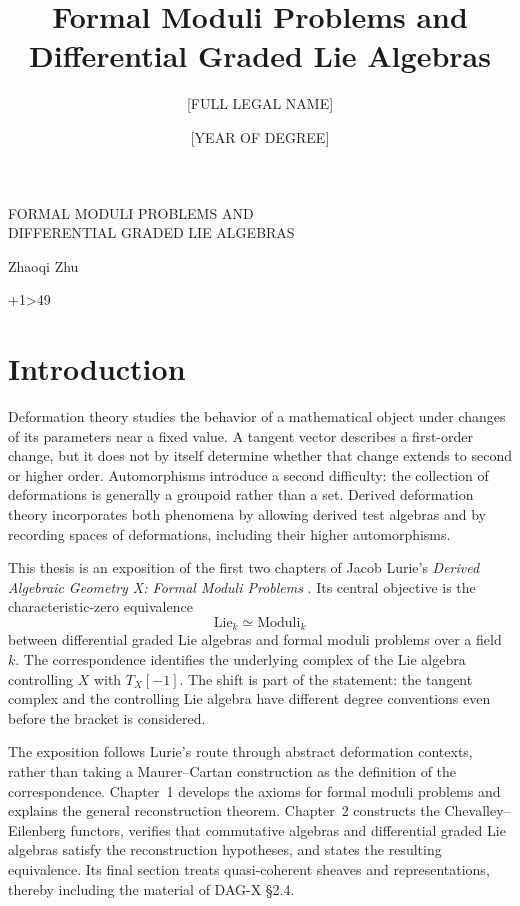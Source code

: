 \documentclass[12pt,letterpaper,oneside]{report}
\title{Formal Moduli Problems and Differential Graded Lie Algebras}
\author{[FULL LEGAL NAME]}
\date{[YEAR OF DEGREE]}
\newcommand{\ThesisTitle}{FORMAL MODULI PROBLEMS AND\\DIFFERENTIAL GRADED LIE ALGEBRAS}
\newcommand{\AuthorName}{Zhaoqi Zhu}
\theoremstyle{definition}
\theoremstyle{remark}
\newcommand{\Lie}{\mathrm{Lie}}
\newcommand{\FMP}{\mathrm{Moduli}}
\begin{document}
\thispagestyle{empty}
\begin{center}
\vspace*{1.5in}
{\Large\ThesisTitle\par}
\vspace{0.4in}
\AuthorName\par
\end{center}
\clearpage
\ifnum\numexpr{}+1\relax>49
  \tableofcontents
  \clearpage
\fi
{}
\chapter*{Introduction}
\label{ch:introduction}

Deformation theory studies the behavior of a mathematical object under changes of its parameters near a fixed value. A tangent vector describes a first-order change, but it does not by itself determine whether that change extends to second or higher order. Automorphisms introduce a second difficulty: the collection of deformations is generally a groupoid rather than a set. Derived deformation theory incorporates both phenomena by allowing derived test algebras and by recording spaces of deformations, including their higher automorphisms.

This thesis is an exposition of the first two chapters of Jacob Lurie's \emph{Derived Algebraic Geometry X: Formal Moduli Problems} \cite{DAGX}. Its central objective is the characteristic-zero equivalence
\[
  \Lie_k \simeq \FMP_k
\]
between differential graded Lie algebras and formal moduli problems over a field $k$. The correspondence identifies the underlying complex of the Lie algebra controlling $X$ with $T_X[-1]$. The shift is part of the statement: the tangent complex and the controlling Lie algebra have different degree conventions even before the bracket is considered.

The exposition follows Lurie's route through abstract deformation contexts, rather than taking a Maurer--Cartan construction as the definition of the correspondence. Chapter~1 develops the axioms for formal moduli problems and explains the general reconstruction theorem. Chapter~2 constructs the Chevalley--Eilenberg functors, verifies that commutative algebras and differential graded Lie algebras satisfy the reconstruction hypotheses, and states the resulting equivalence. Its final section treats quasi-coherent sheaves and representations, thereby including the material of DAG-X \S2.4. 
\end{document}
